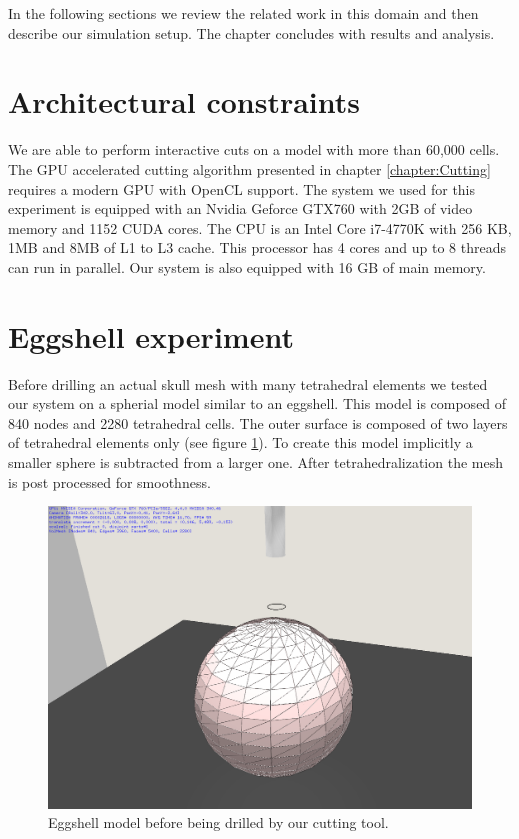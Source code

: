 In the following sections we review the related work in this domain and then describe our simulation 
setup. The chapter concludes with results and analysis.

\section{Architectural constraints}
We are able to perform interactive cuts on a model with more than 60,000 cells. The GPU accelerated cutting algorithm 
presented in chapter \ref{chapter:Cutting} requires a modern GPU with OpenCL support. The system we used for this
experiment is equipped with an Nvidia Geforce GTX760 with 2GB of video memory and 1152 CUDA cores. The CPU is an 
Intel Core i7-4770K with 256 KB, 1MB and 8MB of L1 to L3 cache. This processor has 4 cores and up to 8 threads can run in parallel. 
Our system is also equipped with 16 GB of main memory. 

\section{Eggshell experiment}
Before drilling an actual skull mesh with many tetrahedral elements we tested our system on a spherial model similar to 
an eggshell. This model is composed of 840 nodes and 2280 tetrahedral cells. The outer surface is composed of two layers 
of tetrahedral elements only (see figure \ref{fig:eggshell01}). To create this model implicitly a smaller sphere is subtracted 
from a larger one. After tetrahedralization the mesh is post processed for smoothness.

\begin{figure}[H]
  \centering
  \includegraphics[width=0.7\linewidth]{figures/evaluation/eggshell01.png}
  \caption{\label{fig:eggshell01}
  {Eggshell model before being drilled by our cutting tool.}
}
\end{figure}

